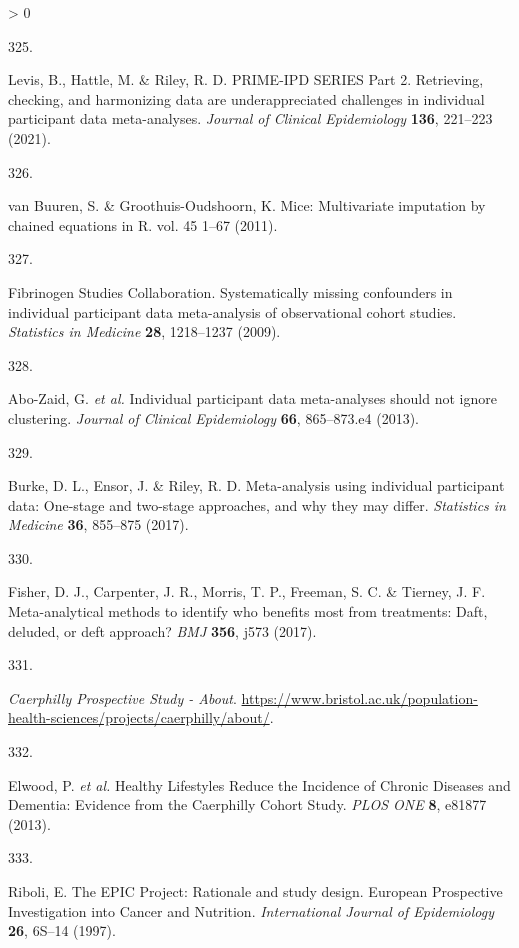 \documentclass[a4paper, twoside]{templates/ociamthesis}
\newlength{\cslhangindent}
\newlength{\csllabelwidth}
\newenvironment{CSLReferences}[3] %
 {%
  \setlength{\parindent}{0pt}
  \ifodd #1 \everypar{\setlength{\hangindent}{\cslhangindent}}\ignorespaces\fi
  \ifnum #2 > 0
  \setlength{\parskip}{#2\baselineskip}
  \fi
 }%
 {}
\newcommand{\CSLLeftMargin}[1]{\parbox[t]{\maxof{\widthof{#1}}{\csllabelwidth}}{#1}}
\newcommand{\CSLRightInline}[1]{\parbox[t]{\linewidth - \csllabelwidth}{#1}}
\begin{document}
\begin{CSLReferences}{0}{0}
\leavevmode\hypertarget{ref-levis2021}{}%
\CSLLeftMargin{325. }
\CSLRightInline{Levis, B., Hattle, M. \& Riley, R. D. {PRIME}-{IPD SERIES Part} 2. {Retrieving}, checking, and harmonizing data are underappreciated challenges in individual participant data meta-analyses. \emph{Journal of Clinical Epidemiology} \textbf{136}, 221--223 (2021).}

\leavevmode\hypertarget{ref-Van_Buuren2011-nc}{}%
\CSLLeftMargin{326. }
\CSLRightInline{van Buuren, S. \& Groothuis-Oudshoorn, K. Mice: Multivariate imputation by chained equations in {R}. vol. 45 1--67 (2011).}

\leavevmode\hypertarget{ref-fibrinogenstudiescollaboration2009}{}%
\CSLLeftMargin{327. }
\CSLRightInline{Fibrinogen Studies Collaboration. Systematically missing confounders in individual participant data meta-analysis of observational cohort studies. \emph{Statistics in Medicine} \textbf{28}, 1218--1237 (2009).}

\leavevmode\hypertarget{ref-abo-zaid2013}{}%
\CSLLeftMargin{328. }
\CSLRightInline{Abo-Zaid, G. \emph{et al.} Individual participant data meta-analyses should not ignore clustering. \emph{Journal of Clinical Epidemiology} \textbf{66}, 865--873.e4 (2013).}

\leavevmode\hypertarget{ref-burke2017}{}%
\CSLLeftMargin{329. }
\CSLRightInline{Burke, D. L., Ensor, J. \& Riley, R. D. Meta-analysis using individual participant data: One-stage and two-stage approaches, and why they may differ. \emph{Statistics in Medicine} \textbf{36}, 855--875 (2017).}

\leavevmode\hypertarget{ref-fisher2017}{}%
\CSLLeftMargin{330. }
\CSLRightInline{Fisher, D. J., Carpenter, J. R., Morris, T. P., Freeman, S. C. \& Tierney, J. F. Meta-analytical methods to identify who benefits most from treatments: Daft, deluded, or deft approach? \emph{BMJ} \textbf{356}, j573 (2017).}

\leavevmode\hypertarget{ref-zotero-15398}{}%
\CSLLeftMargin{331. }
\CSLRightInline{\emph{Caerphilly {Prospective Study} - {About}}. \url{https://www.bristol.ac.uk/population-health-sciences/projects/caerphilly/about/}.}

\leavevmode\hypertarget{ref-elwood2013}{}%
\CSLLeftMargin{332. }
\CSLRightInline{Elwood, P. \emph{et al.} Healthy {Lifestyles Reduce} the {Incidence} of {Chronic Diseases} and {Dementia}: Evidence from the {Caerphilly Cohort Study}. \emph{PLOS ONE} \textbf{8}, e81877 (2013).}

\leavevmode\hypertarget{ref-riboli1997}{}%
\CSLLeftMargin{333. }
\CSLRightInline{Riboli, E. The {EPIC Project}: Rationale and study design. {European Prospective Investigation} into {Cancer} and {Nutrition}. \emph{International Journal of Epidemiology} \textbf{26}, 6S--14 (1997).}


\end{CSLReferences}
\end{document}
